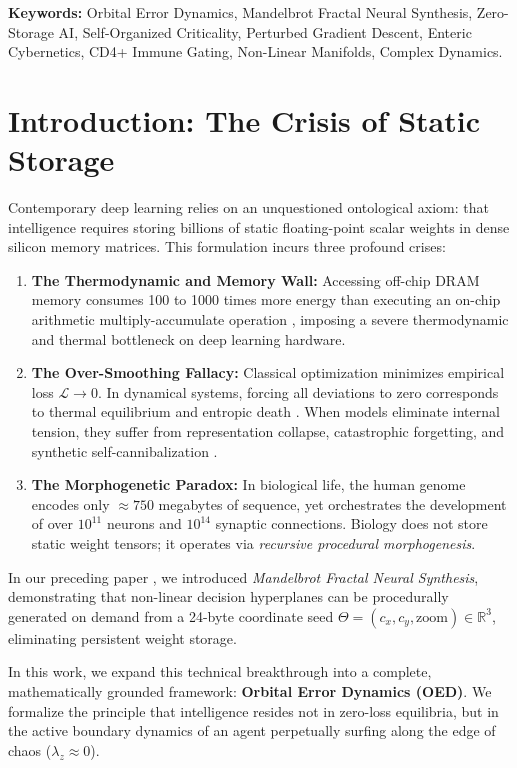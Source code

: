 \documentclass[10pt,journal,compsoc,twocolumn]{article}
\begin{document}
\vspace{0.15cm}
\noindent\textbf{Keywords:} Orbital Error Dynamics, Mandelbrot Fractal Neural Synthesis, Zero-Storage AI, Self-Organized Criticality, Perturbed Gradient Descent, Enteric Cybernetics, CD4+ Immune Gating, Non-Linear Manifolds, Complex Dynamics.

\section{Introduction: The Crisis of Static Storage}
\label{sec:intro}
Contemporary deep learning relies on an unquestioned ontological axiom: that intelligence requires storing billions of static floating-point scalar weights in dense silicon memory matrices. This formulation incurs three profound crises:
\begin{enumerate}
    \item \textbf{The Thermodynamic and Memory Wall:} Accessing off-chip DRAM memory consumes 100 to 1000 times more energy than executing an on-chip arithmetic multiply-accumulate operation \cite{horowitz2014computing}, imposing a severe thermodynamic and thermal bottleneck on deep learning hardware.
    \item \textbf{The Over-Smoothing Fallacy:} Classical optimization minimizes empirical loss $\mathcal{L} \to 0$. In dynamical systems, forcing all deviations to zero corresponds to thermal equilibrium and entropic death \cite{schrodinger1944life, prigogine1977self}. When models eliminate internal tension, they suffer from representation collapse, catastrophic forgetting, and synthetic self-cannibalization \cite{shumailov2024model}.
    \item \textbf{The Morphogenetic Paradox:} In biological life, the human genome encodes only $\approx 750$ megabytes of sequence, yet orchestrates the development of over $10^{11}$ neurons and $10^{14}$ synaptic connections. Biology does not store static weight tensors; it operates via \textit{recursive procedural morphogenesis}.
\end{enumerate}

In our preceding paper \cite{dagli2026mandelbrot}, we introduced \textit{Mandelbrot Fractal Neural Synthesis}, demonstrating that non-linear decision hyperplanes can be procedurally generated on demand from a 24-byte coordinate seed $\Theta = (c_x, c_y, \text{zoom}) \in \mathbb{R}^3$, eliminating persistent weight storage.

In this work, we expand this technical breakthrough into a complete, mathematically grounded framework: \textbf{Orbital Error Dynamics (OED)}. We formalize the principle that intelligence resides not in zero-loss equilibria, but in the active boundary dynamics of an agent perpetually surfing along the edge of chaos ($\lambda_z \approx 0$).
\end{document}
